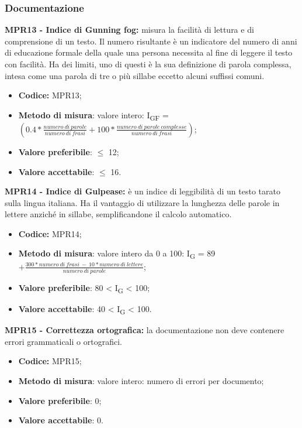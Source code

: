 \subsubsection{Documentazione}
\textbf{MPR13 - Indice di Gunning fog:} misura la facilità di lettura e di comprensione di un testo. Il numero risultante è un indicatore del numero di anni 
di educazione formale della quale una persona necessita al fine di leggere il testo con facilità.
Ha dei limiti, uno di questi è la sua definizione di parola complessa, intesa come una parola di
tre o più sillabe eccetto alcuni suffissi comuni.
\begin{itemize}
    \item \textbf{Codice:} MPR13;
    \item \textbf{Metodo di misura}: valore intero: I\textsubscript{GF} = $(0.4 *\frac{numero \ di \ parole}{numero \ di \ frasi} + 100 * \frac{numero \ di \ parole \ complesse}{numero \ di \ frasi})$;
    \item \textbf{Valore preferibile}: $\leq$ 12;
    \item \textbf{Valore accettabile}: $\leq$ 16.
\end{itemize}
\textbf{MPR14 - Indice di Gulpease:} è un indice di leggibilità di un testo tarato sulla lingua italiana. 
Ha il vantaggio di utilizzare la lunghezza delle parole in lettere anziché in sillabe, semplificandone il calcolo automatico. 
\begin{itemize}
    \item \textbf{Codice:} MPR14;
    \item \textbf{Metodo di misura}: valore intero da 0 a 100: I\textsubscript{G} = 89 $+ \frac{300*numero \ di \ frasi \ - \ 10*numero \ di \ lettere}{numero \ di \ parole}$;
    \item \textbf{Valore preferibile}: 80 < I\textsubscript{G} < 100;
    \item \textbf{Valore accettabile}: 40 < I\textsubscript{G} < 100.
\end{itemize}
\textbf{MPR15 - Correttezza ortografica:} la documentazione non deve contenere errori grammaticali o ortografici. 
\begin{itemize}
    \item \textbf{Codice:} MPR15;
    \item \textbf{Metodo di misura}: valore intero: numero di errori per documento;
    \item \textbf{Valore preferibile}: 0;
    \item \textbf{Valore accettabile}: 0.
\end{itemize}
